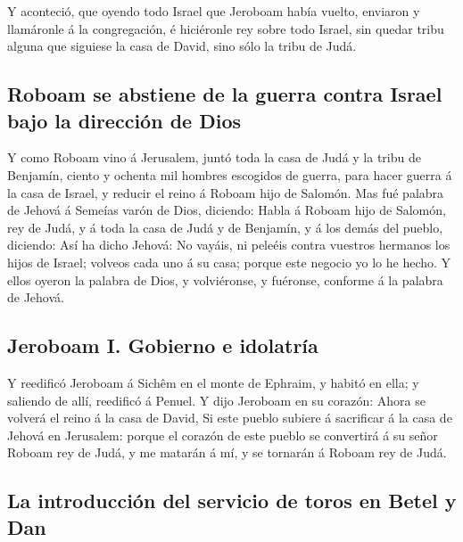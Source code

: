  Y aconteció, que oyendo todo Israel que Jeroboam había
vuelto, enviaron y llamáronle á la congregación, é hiciéronle rey sobre
todo Israel, sin quedar tribu alguna que siguiese la casa de David, sino
sólo la tribu de Judá.

\hypertarget{roboam-se-abstiene-de-la-guerra-contra-israel-bajo-la-direcciuxf3n-de-dios}{%
\subsection{Roboam se abstiene de la guerra contra Israel bajo la
dirección de
Dios}\label{roboam-se-abstiene-de-la-guerra-contra-israel-bajo-la-direcciuxf3n-de-dios}}

 Y como Roboam vino á Jerusalem, juntó toda la casa de Judá
y la tribu de Benjamín, ciento y ochenta mil hombres escogidos de
guerra, para hacer guerra á la casa de Israel, y reducir el reino á
Roboam hijo de Salomón.  Mas fué palabra de Jehová á
Semeías varón de Dios, diciendo:  Habla á Roboam hijo de
Salomón, rey de Judá, y á toda la casa de Judá y de Benjamín, y á los
demás del pueblo, diciendo:  Así ha dicho Jehová: No
vayáis, ni peleéis contra vuestros hermanos los hijos de Israel; volveos
cada uno á su casa; porque este negocio yo lo he hecho. Y ellos oyeron
la palabra de Dios, y volviéronse, y fuéronse, conforme á la palabra de
Jehová.

\hypertarget{jeroboam-i.-gobierno-e-idolatruxeda}{%
\subsection{Jeroboam I. Gobierno e
idolatría}\label{jeroboam-i.-gobierno-e-idolatruxeda}}

 Y reedificó Jeroboam á Sichêm en el monte de Ephraim, y
habitó en ella; y saliendo de allí, reedificó á Penuel.  Y
dijo Jeroboam en su corazón: Ahora se volverá el reino á la casa de
David,  Si este pueblo subiere á sacrificar á la casa de
Jehová en Jerusalem: porque el corazón de este pueblo se convertirá á su
señor Roboam rey de Judá, y me matarán á mí, y se tornarán á Roboam rey
de Judá.

\hypertarget{la-introducciuxf3n-del-servicio-de-toros-en-betel-y-dan}{%
\subsection{La introducción del servicio de toros en Betel y
Dan}\label{la-introducciuxf3n-del-servicio-de-toros-en-betel-y-dan}}

